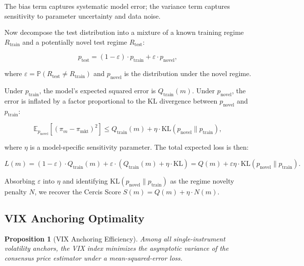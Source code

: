 \documentclass[11pt,a4paper]{article}
\theoremstyle{plain}
\newtheorem{proposition}[theorem]{Proposition}
\theoremstyle{definition}
\theoremstyle{remark}
\newcommand{\E}{\mathbb{E}}
\newcommand{\Pbb}{\mathbb{P}}
\begin{document}
The bias term captures systematic model error; the variance term captures sensitivity to parameter uncertainty and data noise.

Now decompose the test distribution into a mixture of a known training regime $R_{\text{train}}$ and a potentially novel test regime $R_{\text{test}}$:

\begin{equation}\label{eq:mixture}
  p_{\text{test}} = (1 - \varepsilon) \cdot p_{\text{train}} + \varepsilon \cdot p_{\text{novel}},
\end{equation}

where $\varepsilon = \Pbb(R_{\text{test}} \neq R_{\text{train}})$ and $p_{\text{novel}}$ is the distribution under the novel regime.

Under $p_{\text{train}}$, the model's expected squared error is $Q_{\text{train}}(m)$. Under $p_{\text{novel}}$, the error is inflated by a factor proportional to the KL divergence between $p_{\text{novel}}$ and $p_{\text{train}}$:

\begin{equation}\label{eq:novel_error}
  \E_{p_{\text{novel}}}[(\pi_m - \pi_{\text{mkt}})^2] \leq Q_{\text{train}}(m) + \eta \cdot \text{KL}(p_{\text{novel}} \| p_{\text{train}}),
\end{equation}

where $\eta$ is a model-specific sensitivity parameter. The total expected loss is then:

\begin{equation}\label{eq:total_loss}
  L(m) = (1-\varepsilon) \cdot Q_{\text{train}}(m) + \varepsilon \cdot (Q_{\text{train}}(m) + \eta \cdot \text{KL}) = Q(m) + \varepsilon \eta \cdot \text{KL}(p_{\text{novel}} \| p_{\text{train}}).
\end{equation}

Absorbing $\varepsilon$ into $\eta$ and identifying $\text{KL}(p_{\text{novel}} \| p_{\text{train}})$ as the regime novelty penalty $N$, we recover the Cercis Score $S(m) = Q(m) + \eta \cdot N(m)$.

\subsection{VIX Anchoring Optimality}

\begin{proposition}[VIX Anchoring Efficiency]\label{prop:vix_efficiency}
Among all single-instrument volatility anchors, the VIX index minimizes the asymptotic variance of the consensus price estimator under a mean-squared-error loss.
\end{proposition}
\end{document}

